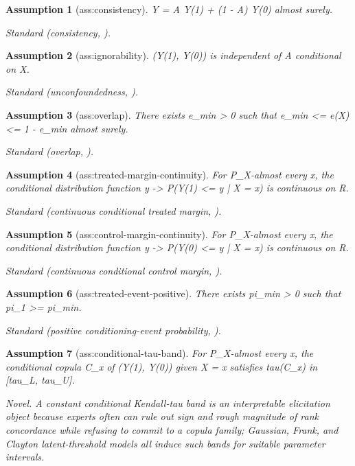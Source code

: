 \documentclass{article}
\newtheorem{assumption}{Assumption}
\begin{document}
\begin{assumption}[ass:consistency]\label{ass:consistency}
Y = A Y(1) + (1 - A) Y(0) almost surely.
\par\smallskip\noindent\emph{Standard} (consistency, \cite{Rubin1974}).
\end{assumption}

\begin{assumption}[ass:ignorability]\label{ass:ignorability}
(Y(1), Y(0)) is independent of A conditional on X.
\par\smallskip\noindent\emph{Standard} (unconfoundedness, \cite{RosenbaumRubin1983}).
\end{assumption}

\begin{assumption}[ass:overlap]\label{ass:overlap}
There exists e_min > 0 such that e_min <= e(X) <= 1 - e_min almost surely.
\par\smallskip\noindent\emph{Standard} (overlap, \cite{RosenbaumRubin1983}).
\end{assumption}

\begin{assumption}[ass:treated-margin-continuity]\label{ass:treated-margin-continuity}
For P_X-almost every x, the conditional distribution function y -> P(Y(1) <= y | X = x) is continuous on R.
\par\smallskip\noindent\emph{Standard} (continuous conditional treated margin, \cite{Nelsen2006}).
\end{assumption}

\begin{assumption}[ass:control-margin-continuity]\label{ass:control-margin-continuity}
For P_X-almost every x, the conditional distribution function y -> P(Y(0) <= y | X = x) is continuous on R.
\par\smallskip\noindent\emph{Standard} (continuous conditional control margin, \cite{Nelsen2006}).
\end{assumption}

\begin{assumption}[ass:treated-event-positive]\label{ass:treated-event-positive}
There exists pi_min > 0 such that pi_1 >= pi_min.
\par\smallskip\noindent\emph{Standard} (positive conditioning-event probability, \cite{ChaogeHanLiuWu2026}).
\end{assumption}

\begin{assumption}[ass:conditional-tau-band]\label{ass:conditional-tau-band}
For P_X-almost every x, the conditional copula C_x of (Y(1), Y(0)) given X = x satisfies tau(C_x) in [tau_L, tau_U].
\par\smallskip\noindent\emph{Novel.} A constant conditional Kendall-tau band is an interpretable elicitation object because experts often can rule out sign and rough magnitude of rank concordance while refusing to commit to a copula family; Gaussian, Frank, and Clayton latent-threshold models all induce such bands for suitable parameter intervals.
\end{assumption}
\end{document}
